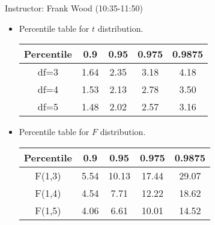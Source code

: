 \documentclass[12pt]{article}
\begin{document}

 \begin{center}
  Instructor: Frank Wood (10:35-11:50) 
 \end{center}
\studentinfo
{}
\finishfirstpage

\begin{itemize}
  \item Percentile table for $t$ distribution.
\begin{center}

\begin{tabular}{c|cccc}
  \toprule
Percentile&0.9&0.95&0.975&0.9875\\
\midrule
df=3 & 1.64 & 2.35 & 3.18 & 4.18 \\
  df=4& 1.53 & 2.13 & 2.78 & 3.50 \\
  df=5 & 1.48 & 2.02 & 2.57 & 3.16 \\
\bottomrule
\end{tabular}
\end{center}
 \item Percentile table for $F$ distribution.
\begin{center}

\begin{tabular}{c|cccc}
\toprule
Percentile&0.9&0.95&0.975&0.9875\\
\midrule
F(1,3)& 5.54 & 10.13 & 17.44 & 29.07 \\
F(1,4)&4.54 & 7.71 & 12.22 & 18.62 \\
F(1,5)&4.06 & 6.61 & 10.01 & 14.52 \\
\bottomrule
\end{tabular}
\end{center}
\end{itemize}
\end{document}
